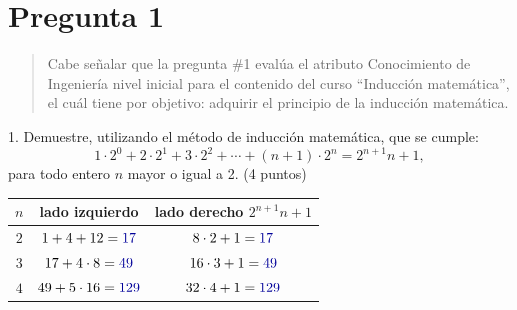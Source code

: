 \documentclass[11pt]{article}
\begin{document}
\clearpage
\section*{Pregunta 1}

\begin{quote}
Cabe señalar que la pregunta \#1 evalúa el atributo Conocimiento de Ingeniería nivel inicial para el contenido del curso ``Inducción matemática'', el cuál tiene por objetivo: adquirir el principio de la inducción matemática.
\end{quote}

1. Demuestre, utilizando el \colorbox{green!35}{método de inducción matemática}, que se cumple:
\[1\cdot 2^0+2\cdot 2^1+3\cdot 2^2+\cdots+(n+1)\cdot 2^n=2^{n+1}n+1,\]
para todo entero \colorbox{green!35}{$n$ mayor o igual a 2}. \hfill (4 puntos)

\begin{center}\small
\renewcommand{\arraystretch}{1.1}
\begin{tabular}{|c|c|c|}
\hline
$n$ & lado izquierdo & lado derecho $2^{n+1}n+1$\\ \hline
$2$ & $1+4+12=\textcolor{blue!60!black}{17}$ & $8\cdot2+1=\textcolor{blue!60!black}{17}$\\ \hline
$3$ & $17+4\cdot 8=\textcolor{blue!60!black}{49}$ & $16\cdot3+1=\textcolor{blue!60!black}{49}$\\ \hline
$4$ & $49+5\cdot 16=\textcolor{blue!60!black}{129}$ & $32\cdot4+1=\textcolor{blue!60!black}{129}$\\ \hline
\end{tabular}
\end{center}

\end{document}
